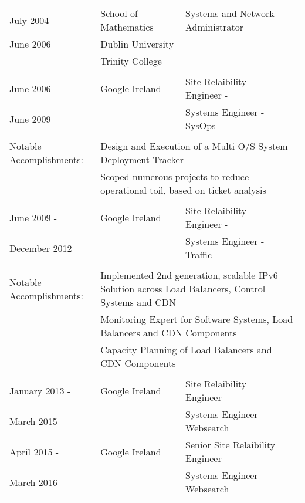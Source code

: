 \documentclass[a4paper, 11pt] {article}
\begin{document}
\begin{tabular}{llll}
July 2004 -	& 	School of Mathematics	&  Systems and Network Administrator 	&			\\
June 2006	& 	Dublin University	&					&			\\
		& 	Trinity College		&					&			\\
		& 				&					&			\\
June 2006 - 	&	Google Ireland		&  Site Relaibility Engineer -		&	\hspace{10mm}	\\
June 2009 	&				&  Systems Engineer - SysOps       	&            		\\
      		&				&              				&            		\\
Notable Accomplishments: & \multicolumn{3}{l}{Design and Execution of a Multi O/S System Deployment Tracker} 	\\
			 & \multicolumn{3}{l}{Scoped numerous projects to reduce operational toil, based on ticket analysis}\\ 
		& 				&					&			\\
June 2009 - 	&	Google Ireland		&  Site Relaibility Engineer -		&	\hspace{10mm}	\\
December 2012 	&				&  Systems Engineer - Traffic       	&            		\\
      		&				&              				&            		\\
Notable Accomplishments: & \multicolumn{3}{l}{Implemented 2nd generation, scalable IPv6 Solution across Load Balancers, Control Systems and CDN} \\
			 & \multicolumn{3}{l}{Monitoring Expert for Software Systems, Load Balancers and CDN Components}	\\ 
			 & \multicolumn{3}{l}{Capacity Planning of Load Balancers and CDN Components}	\\ 
		& 				&					&			\\
January 2013 -	&	Google Ireland		&  Site Relaibility Engineer -		&	\hspace{10mm}	\\
March 2015 	&				&  Systems Engineer - Websearch       	&            		\\
April 2015 -	&	Google Ireland		&  Senior Site Relaibility Engineer -	&	\hspace{10mm}	\\
March 2016 	&				&  Systems Engineer - Websearch       	&            		\\

\end{tabular}
\end{document}
